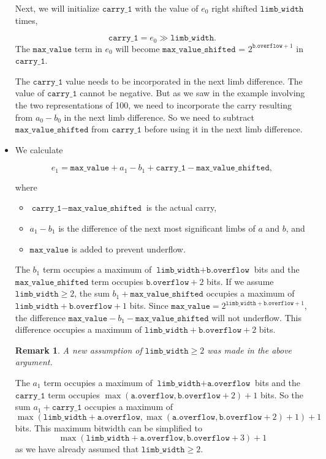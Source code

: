 \documentclass[a4paper, 12pt]{article}
\newtheorem*{remark}{Remark}
\begin{document}
\begin{itemize}
    Next, we will initialize $\texttt{carry\_1}$ with the value of $e_0$ right shifted $\texttt{limb\_width}$ times,
    
    $$\texttt{carry\_1} = e_0 \gg \texttt{limb\_width}.$$
    The $\texttt{max\_value}$ term in $e_0$ will become $\texttt{max\_value\_shifted}$ = $2^{\texttt{b.overflow}+1}$ in $\texttt{carry\_1}$.
    
    The $\texttt{carry\_1}$ value needs to be incorporated in the next limb difference. The value of $\texttt{carry\_1}$ cannot be negative. But as we saw in the example involving the two representations of 100, we need to incorporate the carry resulting from $a_0 - b_0$ in the next limb difference. So we need to subtract $\texttt{max\_value\_shifted}$ from $\texttt{carry\_1}$ before using it in the next limb difference.

  \item We calculate 

    $$e_1 = \texttt{max\_value} + a_1 - b_1 + \texttt{carry\_1} - \texttt{max\_value\_shifted},$$

    where
    \begin{itemize}
      \item $\texttt{carry\_1} - \texttt{max\_value\_shifted}$ is the actual carry,
      \item $a_1 - b_1$ is the difference of the next most significant limbs of $a$ and $b$, and
      \item $\texttt{max\_value}$ is added to prevent underflow.
    \end{itemize}
    
    The $b_1$ term occupies a maximum of $\texttt{limb\_width} + \texttt{b.overflow}$ bits and the $\texttt{max\_value\_shifted}$ term occupies $\texttt{b.overflow} + 2$ bits. If we assume $\texttt{limb\_width} \ge 2$, the sum $b_1 + \texttt{max\_value\_shifted}$ occupies a maximum of $\texttt{limb\_width} + \texttt{b.overflow} + 1$ bits. Since $\texttt{max\_value} = 2^{\texttt{limb\_width}+\texttt{b.overflow}+1}$, the difference $\texttt{max\_value} - b_1 - \texttt{max\_value\_shifted}$ will not underflow. This difference occupies a maximum of $\texttt{limb\_width} + \texttt{b.overflow} + 2$ bits.

    \begin{remark}
    A new assumption of $\texttt{limb\_width} \ge 2$ was made in the above argument.
    \end{remark}

    The $a_1$ term occupies a maximum of $\texttt{limb\_width} + \texttt{a.overflow}$ bits and the $\texttt{carry\_1}$ term occupies $\max(\texttt{a.overflow}, \texttt{b.overflow} + 2) + 1$ bits. So the sum $a_1 + \texttt{carry\_1}$ occupies a maximum of 
    $$\max(\texttt{limb\_width} + \texttt{a.overflow}, \max(\texttt{a.overflow}, \texttt{b.overflow} + 2) + 1) + 1$$
    bits. This maximum bitwidth can be simplified to 
    $$\max(\texttt{limb\_width} + \texttt{a.overflow}, \texttt{b.overflow} + 3) + 1$$
    as we have already assumed that $\texttt{limb\_width} \ge 2$.
    

\end{itemize}
\end{document}
